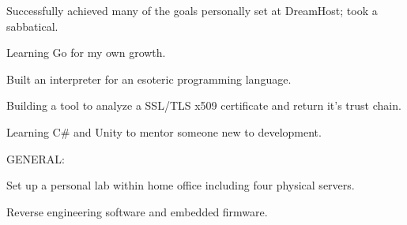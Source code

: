 \item Successfully achieved many of the goals personally set at DreamHost; took a sabbatical.
\item Learning Go for my own growth.
\item Built an interpreter for an esoteric programming language. %
\item Building a tool to analyze a SSL/TLS x509 certificate and return it's trust chain.
\item Learning C\# and Unity to mentor someone new to development.

\item GENERAL:
\item Set up a personal lab within home office including four physical servers.
\item Reverse engineering software and embedded firmware.
